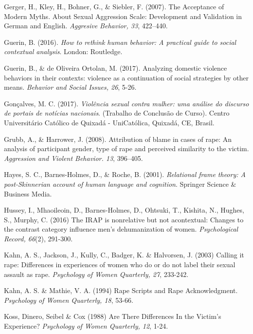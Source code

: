 \hangindent=25pt
\noindent Gerger, H., Kley, H., Bohner, G., \& Siebler, F. (2007). The Acceptance of Modern Myths. About Sexual Aggression Scale: Development and Validation in German and English. \textit{Aggresive Behavior, 33}, 422–440.

\hangindent=25pt
\noindent Guerin, B. (2016). \textit{How to rethink human behavior: A practical guide to social contextual analysis}. London: Routledge.

\hangindent=25pt
\noindent Guerin, B., \& de Oliveira Ortolan, M. (2017). Analyzing domestic violence behaviors in their contexts: violence as a continuation of social strategies by other means. \textit{Behavior and Social Issues, 26}, 5-26.

\hangindent=25pt
\noindent Gonçalves, M. C. (2017). \textit{Violência sexual contra mulher: uma análise do discurso de portais de notícias nacionais}. (Trabalho de Conclusão de Curso). Centro Universitário Católico de Quixadá - UniCatólica, Quixadá, CE, Brasil.

\hangindent=25pt
\noindent Grubb, A., \& Harrower, J. (2008). Attribution of blame in cases of rape: An analysis of participant gender, type of rape and perceived similarity to the victim. \textit{Aggression and Violent Behavior. 13}, 396–405.

\hangindent=25pt
\noindent Hayes, S. C., Barnes-Holmes, D., \& Roche, B. (2001). \textit{Relational frame theory: A post-Skinnerian account of human language and cognition}. Springer Science \& Business Media. 

\hangindent=25pt
\noindent Hussey, I., Mhaoileoin, D., Barnes-Holmes, D., Ohtsuki, T., Kishita, N., Hughes, S., Murphy, C. (2016) The IRAP is nonrelative but not acontextual: Changes to the contrast category influence men's dehumanization of women. \textit{Psychological Record, 66}(2), 291-300.

\hangindent=25pt
\noindent Kahn, A. S., Jackson, J., Kully, C., Badger, K. \& Halvorsen, J. (2003) Calling it rape: Differences in experiences of women who do or do not label their sexual assault as rape. \textit{Psychology of Women Quarterly, 27}, 233-242.

\hangindent=25pt
\noindent Kahn, A. S. \& Mathie, V. A. (1994) Rape Scripts and Rape Acknowledgment. \textit{Psychology of Women Quarterly, 18}, 53-66.

\hangindent=25pt
\noindent Koss, Dinero, Seibel \& Cox (1988) Are There Differences In the Victim's Experience? \textit{Psychology of Women Quarterly, 12}, 1-24.

